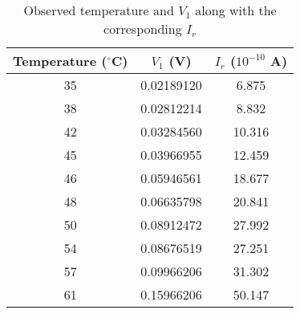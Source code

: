 \begin{table}[]
    \centering
    \begin{tabular}{|c|c|c|} \hline
    Temperature ($^\circ$C) & $V_1$ (V) & $I_r$ ($10^{-10}$ A) \\ \hline
    35 & 0.02189120 & 6.875 \\ 
    38 & 0.02812214 & 8.832 \\ 
    42 & 0.03284560 & 10.316 \\ 
    45 & 0.03966955 & 12.459 \\ 
    46 & 0.05946561 & 18.677 \\ 
    48 & 0.06635798 & 20.841 \\ 
    50 & 0.08912472 & 27.992 \\ 
    54 & 0.08676519 & 27.251 \\ 
    57 & 0.09966206 & 31.302 \\ 
    61 & 0.15966206 & 50.147 \\ \hline
    \end{tabular}
    \caption{Observed temperature and $V_1$ along with the corresponding $I_r$}
\label{tab}
\end{table}